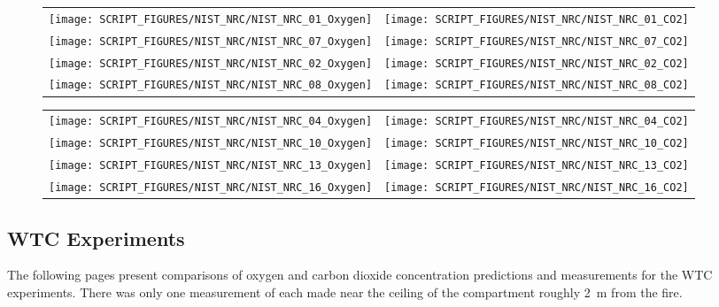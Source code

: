 \begin{figure}[p]
\begin{tabular*}{\textwidth}{l@{\extracolsep{\fill}}r}
\texttt{[image: SCRIPT\_FIGURES/NIST\_NRC/NIST\_NRC\_01\_Oxygen]} &
\texttt{[image: SCRIPT\_FIGURES/NIST\_NRC/NIST\_NRC\_01\_CO2]} \\
\texttt{[image: SCRIPT\_FIGURES/NIST\_NRC/NIST\_NRC\_07\_Oxygen]} &
\texttt{[image: SCRIPT\_FIGURES/NIST\_NRC/NIST\_NRC\_07\_CO2]} \\
\texttt{[image: SCRIPT\_FIGURES/NIST\_NRC/NIST\_NRC\_02\_Oxygen]} &
\texttt{[image: SCRIPT\_FIGURES/NIST\_NRC/NIST\_NRC\_02\_CO2]} \\
\texttt{[image: SCRIPT\_FIGURES/NIST\_NRC/NIST\_NRC\_08\_Oxygen]} &
\texttt{[image: SCRIPT\_FIGURES/NIST\_NRC/NIST\_NRC\_08\_CO2]}
\end{tabular*}
\label{NIST_NRC_Gas_Closed_1}
\end{figure}

\begin{figure}[p]
\begin{tabular*}{\textwidth}{l@{\extracolsep{\fill}}r}
\texttt{[image: SCRIPT\_FIGURES/NIST\_NRC/NIST\_NRC\_04\_Oxygen]} &
\texttt{[image: SCRIPT\_FIGURES/NIST\_NRC/NIST\_NRC\_04\_CO2]} \\
\texttt{[image: SCRIPT\_FIGURES/NIST\_NRC/NIST\_NRC\_10\_Oxygen]} &
\texttt{[image: SCRIPT\_FIGURES/NIST\_NRC/NIST\_NRC\_10\_CO2]} \\
\texttt{[image: SCRIPT\_FIGURES/NIST\_NRC/NIST\_NRC\_13\_Oxygen]} &
\texttt{[image: SCRIPT\_FIGURES/NIST\_NRC/NIST\_NRC\_13\_CO2]} \\
\texttt{[image: SCRIPT\_FIGURES/NIST\_NRC/NIST\_NRC\_16\_Oxygen]} &
\texttt{[image: SCRIPT\_FIGURES/NIST\_NRC/NIST\_NRC\_16\_CO2]}
\end{tabular*}
\label{NIST_NRC_Gas_Closed_2}
\end{figure}

\clearpage

\subsection{WTC Experiments}

The following pages present comparisons of oxygen and carbon dioxide concentration predictions and measurements for the
WTC experiments. There was only one measurement of each made near the ceiling of the compartment roughly 2~m from the fire.


